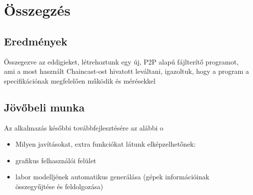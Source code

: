 \chapter{Összegzés}
\label{chp:summary}

\section{Eredmények}
Összegezve az eddigieket, létrehoztunk egy új, P2P alapú fájlterítő programot, ami a most használt Chaincast-ost hivatott leváltani, igazoltuk, hogy a program a specifikációnak megfelelően működik és mérésekkel 


\section{Jövőbeli munka}
Az alkalmazás későbbi továbbfejlesztésére az alábbi o

\begin{itemize}
  \item Milyen javításokat, extra funkciókat látunk elképzelhetőnek:
  \item grafikus felhasználói felület
  \item labor modelljének automatikus generálása (gépek információinak összegyűjtése és feldolgozása)
\end{itemize}